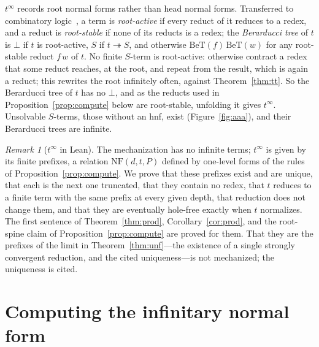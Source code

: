 \documentclass[11pt]{amsart}
\theoremstyle{definition}
\theoremstyle{remark}
\newtheorem{remark}[theorem]{Remark}
\begin{document}
\noindent $t^\infty$ records root normal forms rather than head normal forms. Transferred to
combinatory logic~\citep{berarducci,dots}, a term is \emph{root-active} if every reduct of it
reduces to a redex, and a reduct is \emph{root-stable} if none of its reducts is a redex; the
\emph{Berarducci tree} of $t$ is $\bot$ if $t$ is root-active, $S$ if $t\twoheadrightarrow S$, and otherwise
$\mathrm{BeT}(f)\,\mathrm{BeT}(w)$ for any root-stable reduct $f\,w$ of $t$. No finite
$S$-term is root-active: otherwise contract a redex that some reduct reaches, at the root, and
repeat from the result, which is again a reduct; this rewrites the root infinitely often,
against Theorem~\ref{thm:tt}. So the Berarducci tree of $t$ has no $\bot$, and as the
reducts used in Proposition~\ref{prop:compute} below are root-stable, unfolding it gives
$t^\infty$. Unsolvable $S$-terms, those without an hnf, exist (Figure~\ref{fig:aaa}), and
their Berarducci trees are infinite.

\begin{remark}[$t^\infty$ in Lean]\label{rem:lean}
The mechanization has no infinite terms; $t^\infty$ is given by its finite prefixes, a relation
$\mathrm{NF}(d,t,P)$ defined by one-level forms of the rules of Proposition~\ref{prop:compute}. We prove
that these prefixes exist and are unique, that each is the next one truncated, that they contain
no redex, that $t$ reduces to a finite term with the same prefix at every given depth, that
reduction does not change them, and that they are eventually hole-free exactly when $t$
normalizes. The first sentence of Theorem~\ref{thm:prod}, Corollary~\ref{cor:prod}, and the root-spine
claim of Proposition~\ref{prop:compute} are proved for them. That they
are the prefixes of the limit in Theorem~\ref{thm:unf}---the existence of a single strongly
convergent reduction, and the cited uniqueness---is not mechanized; the uniqueness is cited.
\end{remark}

\section{Computing the infinitary normal form}\label{sec:compute}
\end{document}
